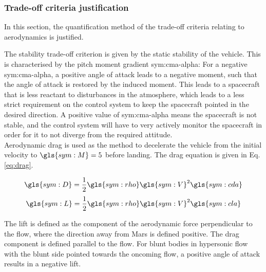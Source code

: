 \subsubsection{Trade-off criteria justification} \label{sec:tradeoffaero}
In this section, the quantification method of the trade-off criteria relating to aerodynamics is justified.

The stability trade-off criterion is given by the static stability of the vehicle. This is characterised by the pitch moment gradient \gls{sym:cma-alpha}: For a negative \gls{sym:cma-alpha}, a positive angle of attack leads to a negative moment, such that the angle of attack is restored by the induced moment. This leads to a spacecraft that is less reactant to disturbances in the atmosphere, which leads to a less strict requirement on the control system to keep the spacecraft pointed in the desired direction. A positive value of \gls{sym:cma-alpha} means the spacecraft is not stable, and the control system will have to very actively monitor the spacecraft in order for it to not diverge from the required attitude. \\


Aerodynamic drag is used as the method to decelerate the vehicle from the initial velocity to $\gls{sym:M}=5$ before landing. The drag equation is given in Eq. \ref{eq:drag}.

\begin{equation} \label{eq:drag}
\gls{sym:D} = \frac{1}{2}\gls{sym:rho}\gls{sym:V}^2\gls{sym:cda}
\end{equation}
\begin{equation} \label{eq:lift}
\gls{sym:L} = \frac{1}{2}\gls{sym:rho}\gls{sym:V}^2\gls{sym:cla}
\end{equation}

The lift is defined as the component of the aerodynamic force perpendicular to the flow, where the direction away from Mars is defined positive. The drag component is defined parallel to the flow. For blunt bodies in hypersonic flow with the blunt side pointed towards the oncoming flow, a positive angle of attack results in a negative lift.


